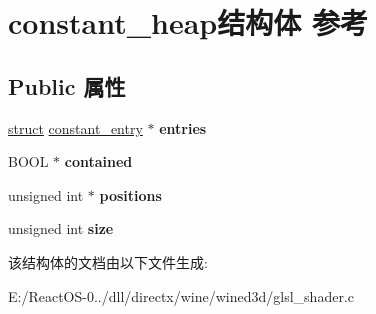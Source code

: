 \hypertarget{structconstant__heap}{}\section{constant\+\_\+heap结构体 参考}
\label{structconstant__heap}
\subsection*{Public 属性}
\begin{DoxyCompactItemize}
\item 
\mbox{\label{structconstant__heap_a379ec3f2a3cb91ba87ffc8bb6356f519}} 
\hyperlink{interfacestruct}{struct} \hyperlink{structconstant__entry}{constant\+\_\+entry} $\ast$ {\bfseries entries}
\item 
\mbox{\label{structconstant__heap_a018b632116851eb11105ea01d27d8e8f}} 
B\+O\+OL $\ast$ {\bfseries contained}
\item 
\mbox{\label{structconstant__heap_ab54625f9d645106ffb2d1a03a58ef06f}} 
unsigned int $\ast$ {\bfseries positions}
\item 
\mbox{\label{structconstant__heap_aa1a3bb21f1d3bd6be9530fff74a21244}} 
unsigned int {\bfseries size}
\end{DoxyCompactItemize}


该结构体的文档由以下文件生成\+:\begin{DoxyCompactItemize}
\item 
E\+:/\+React\+O\+S-\/0../dll/directx/wine/wined3d/glsl\+\_\+shader.\+c\end{DoxyCompactItemize}
